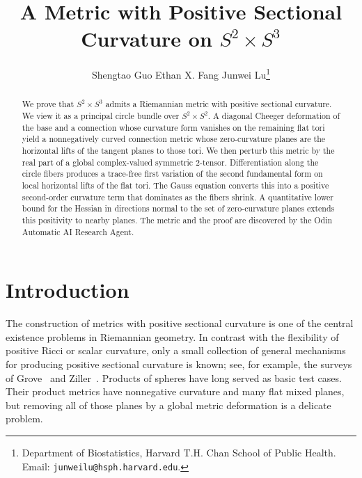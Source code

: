 \documentclass[11pt]{article}
\title{\LARGE A Metric with Positive Sectional Curvature on $S^2\times S^3$}
\author{
  Shengtao Guo \qquad
  Ethan X. Fang \qquad
  Junwei Lu\thanks{Department of Biostatistics, Harvard T.H. Chan School of
	Public Health. Email: \texttt{junweilu@hsph.harvard.edu}.}
}
\date{}
\theoremstyle{definition}
\theoremstyle{remark}
\begin{document}
\maketitle

\begin{abstract}
We prove that $S^2\times S^3$ admits a Riemannian metric with positive
sectional curvature.  We view it as a principal circle bundle over
$S^2\times S^2$.  A diagonal Cheeger deformation of the base and a connection
whose curvature form vanishes on the remaining flat tori yield a
nonnegatively curved connection metric whose zero-curvature planes are the
horizontal lifts of the tangent planes to those tori.  We then perturb this
metric by the real part of a global complex-valued symmetric $2$-tensor.
Differentiation along the circle fibers produces a trace-free first variation
of the second fundamental form on local horizontal lifts of the flat tori.
The Gauss equation converts this into a positive second-order curvature term
that dominates as the fibers shrink.  A quantitative lower bound for the
Hessian in directions normal to the set of zero-curvature planes extends
this positivity to nearby planes. The metric and the proof are discovered by the Odin Automatic AI Research Agent.
\end{abstract}


\section{Introduction}

The construction of metrics with positive sectional curvature is one of the
central existence problems in Riemannian geometry.  In contrast with the
flexibility of positive Ricci or scalar curvature, only a small collection of
general mechanisms for producing positive sectional curvature is known; see,
for example, the surveys of Grove~\cite{Grove2009} and
Ziller~\cite{Ziller2007}.  Products of spheres have long served as basic test
cases.  Their product metrics have nonnegative curvature and many flat mixed
planes, but removing all of those planes by a global metric deformation is a
delicate problem.
\end{document}
